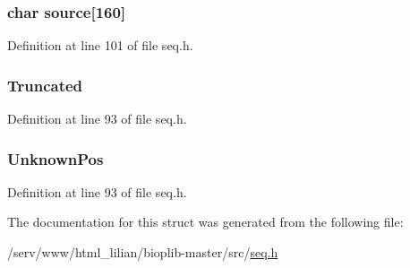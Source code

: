 \hypertarget{struct_s_e_q_i_n_f_o_afd881c5e19c55c444144220d23cf7975}{
\subsubsection[{source}]{\setlength{\rightskip}{0pt plus 5cm}char source\mbox{[}160\mbox{]}}}\label{struct_s_e_q_i_n_f_o_afd881c5e19c55c444144220d23cf7975}


Definition at line 101 of file seq.\-h.

\hypertarget{struct_s_e_q_i_n_f_o_a0e2af1ca77e3096edf3edfd9e6bf044e}{
\subsubsection[{Truncated}]{ Truncated}}\label{struct_s_e_q_i_n_f_o_a0e2af1ca77e3096edf3edfd9e6bf044e}


Definition at line 93 of file seq.\-h.

\hypertarget{struct_s_e_q_i_n_f_o_a1368f4aa930338adc7d35fb51215578c}{
\subsubsection[{Unknown\-Pos}]{ Unknown\-Pos}}\label{struct_s_e_q_i_n_f_o_a1368f4aa930338adc7d35fb51215578c}


Definition at line 93 of file seq.\-h.



The documentation for this struct was generated from the following file\-:\begin{DoxyCompactItemize}
\item 
/serv/www/html\-\_\-lilian/bioplib-\/master/src/\hyperlink{seq_8h}{seq.\-h}\end{DoxyCompactItemize}
